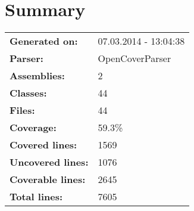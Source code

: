 \documentclass[a4paper,10pt]{article}
\begin{document}
\setcounter{secnumdepth}{-1}
\section{Summary}
\begin{longtable}[l]{ll}
\textbf{Generated on:} & 07.03.2014 - 13:04:38\\
\textbf{Parser:} & OpenCoverParser\\
\textbf{Assemblies:} & 2\\
\textbf{Classes:} & 44\\
\textbf{Files:} & 44\\
\textbf{Coverage:} & 59.3\%\\
\textbf{Covered lines:} & 1569\\
\textbf{Uncovered lines:} & 1076\\
\textbf{Coverable lines:} & 2645\\
\textbf{Total lines:} & 7605\\
\end{longtable}
\end{document}
